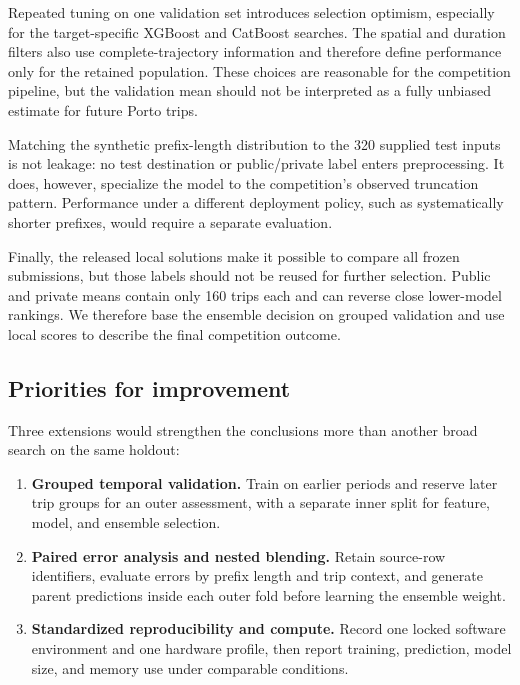 Repeated tuning on one validation set introduces selection optimism, especially for the target-specific XGBoost and CatBoost searches.  The spatial and duration filters also use complete-trajectory information and therefore define performance only for the retained population.  These choices are reasonable for the competition pipeline, but the validation mean should not be interpreted as a fully unbiased estimate for future Porto trips.

Matching the synthetic prefix-length distribution to the 320 supplied test inputs is not leakage: no test destination or public/private label enters preprocessing.  It does, however, specialize the model to the competition's observed truncation pattern.  Performance under a different deployment policy, such as systematically shorter prefixes, would require a separate evaluation.

Finally, the released local solutions make it possible to compare all frozen submissions, but those labels should not be reused for further selection.  Public and private means contain only 160 trips each and can reverse close lower-model rankings.  We therefore base the ensemble decision on grouped validation and use local scores to describe the final competition outcome.

\subsection{Priorities for improvement}

Three extensions would strengthen the conclusions more than another broad search on the same holdout:

\begin{enumerate}
  \item \textbf{Grouped temporal validation.}  Train on earlier periods and reserve later trip groups for an outer assessment, with a separate inner split for feature, model, and ensemble selection.
  \item \textbf{Paired error analysis and nested blending.}  Retain source-row identifiers, evaluate errors by prefix length and trip context, and generate parent predictions inside each outer fold before learning the ensemble weight.
  \item \textbf{Standardized reproducibility and compute.}  Record one locked software environment and one hardware profile, then report training, prediction, model size, and memory use under comparable conditions.
\end{enumerate}
